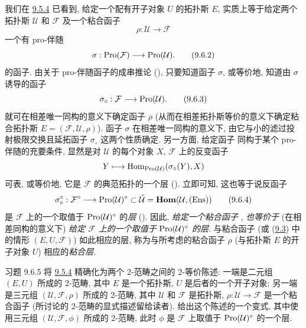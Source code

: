 我们在 \hyperref[IV.theo9.5.4]{9.5.4} 已看到,
给定一个配有开子对象 $U$ 的拓扑斯 $E$,
实质上等于给定两个拓扑斯 $\mathcal{U}$ 和 $\mathcal{F}$ 及一个粘合函子
\begin{equation*}
\rho:\mathcal{U}\longrightarrow \mathcal{F}\tag{9.6.1}
\end{equation*}
\ie 一个有 pro-伴随
\begin{equation*}
\sigma:\operatorname{Pro}(\mathcal{F})\longrightarrow
\operatorname{Pro}(\mathcal{U}){}.\tag{9.6.2}
\end{equation*}
的函子.
由关于 pro-伴随函子的成串推论 (),
只要知道函子 $\sigma$,
或等价地, 知道由 $\sigma$ 诱导的函子
\begin{equation*}
\sigma_{\circ}:\mathcal{F}\longrightarrow
\operatorname{Pro}(\mathcal{U}){}.\tag{9.6.3}
\end{equation*}
就可在相差唯一同构的意义下确定函子 $\rho$
(从而在相差拓扑斯等价的意义下确定粘合拓扑斯
$E=(\mathcal{F},\mathcal{U},\rho)$).
函子 $\sigma$ 在相差唯一同构的意义下,
由它与小的滤过投射极限交换且延拓函子 $\sigma_\circ$ 这两个性质确定.
另一方面, 给定函子  同构于某个 pro-伴随的充要条件,
显然是对 $\mathcal{U}$ 的每个对象 $X$,
$\mathcal{F}$ 上的反变函子
$$
Y\longmapsto \operatorname{Hom}_{\operatorname{Pro}(\mathcal{U})}(\sigma_{\circ}(Y),X)
$$
可表\pageoriginale,
或等价地, 它是 $\mathcal{F}$ 的典范拓扑的一个层
().
立即可知, 这也等于说反函子
\begin{equation*}
\sigma_{\circ}^{\circ}:\mathcal{F}^{\circ}\longrightarrow
\operatorname{Pro}(\mathcal{U})^{\circ}\subset
\check{\mathcal{U}}=\operatorname{\mathbf{Hom}}(\mathcal{U},(\operatorname{Ens}))\tag{9.6.4}
\end{equation*}
是 $\mathcal{F}$ 上的一个取值于 $\operatorname{Pro}(\mathcal{U})^{\circ}$ 的\emph{层}
().
因此, \emph{给定一个粘合函子} ,
\emph{也等价于} (在相差同构的意义下)
\emph{给定 $\mathcal{F}$ 上的一个取值于} $\operatorname{Pro}(\mathcal{U})^{\circ}$ \emph{的层}.
与粘合函子 (或 (\hyperref[IV.subsec9.3]{9.3}) 中的情形 $(E,U,\mathcal{F})$)
如此相应的层,
称为与所考虑的粘合函子 $\rho$
(\resp 与拓扑斯 $E$ 的开子对象 $U$) 相应的\emph{粘合层}.

\begin{enonce*}[remark]{习题 9.6.5}
将 \hyperref[IV.theo9.5.4]{9.5.4} 精确化为两个 2-范畴之间的 2-等价陈述:
一端是二元组 $(E,U)$ 所成的 2-范畴,
其中 $E$ 是一个拓扑斯, $U$ 是后者的一个开子对象;
另一端是三元组 $(\mathcal{U},\mathcal{F},\rho)$ 所成的 2-范畴,
其中 $\mathcal{U}$ 和 $\mathcal{F}$ 是拓扑斯,
$\rho:\mathcal{U}\rightarrow\mathcal{F}$ 是一个粘合函子
(所讨论的 2-范畴的显式描述留给读者).
给出这个陈述的一个变式,
其中使用三元组 $(\mathcal{U},\mathcal{F},\phi)$ 所成的 2-范畴,
此时 $\phi$ 是 $\mathcal{F}$ 上取值于 $\operatorname{Pro}(\mathcal{U})^{\circ}$ 的一个层.
\end{enonce*}

